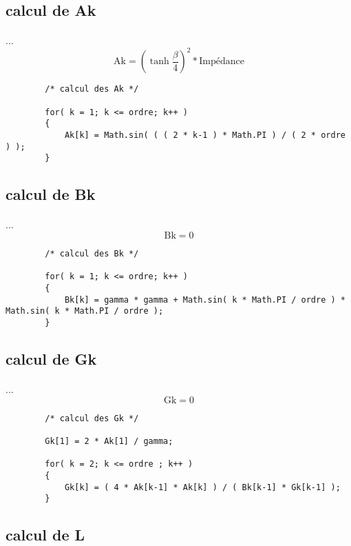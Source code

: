 \documentclass[a4paper,11pt]{article}
\begin{document}
\subsection{calcul de Ak }
    \paragraph{}
    ... \[ \mbox{Ak} = ( \tanh{ \frac{ \beta }{ 4 } } ) ^2 * \mbox{Impédance} \]
    \begin{lstlisting}
        /* calcul des Ak */

        for( k = 1; k <= ordre; k++ )
        {
            Ak[k] = Math.sin( ( ( 2 * k-1 ) * Math.PI ) / ( 2 * ordre ) );
        }

    \end{lstlisting}

\subsection{calcul de Bk }
    \paragraph{}
    ... \[ \mbox{Bk} = 0 \]
    \begin{lstlisting}
        /* calcul des Bk */

        for( k = 1; k <= ordre; k++ )
        {
            Bk[k] = gamma * gamma + Math.sin( k * Math.PI / ordre ) * Math.sin( k * Math.PI / ordre );
        }

    \end{lstlisting}

\subsection{calcul de Gk }
    \paragraph{}
    ... \[ \mbox{Gk} = 0 \]
    \begin{lstlisting}
        /* calcul des Gk */

        Gk[1] = 2 * Ak[1] / gamma;

        for( k = 2; k <= ordre ; k++ )
        {
            Gk[k] = ( 4 * Ak[k-1] * Ak[k] ) / ( Bk[k-1] * Gk[k-1] );
        }

    \end{lstlisting}

\subsection{calcul de L }
\end{document}
